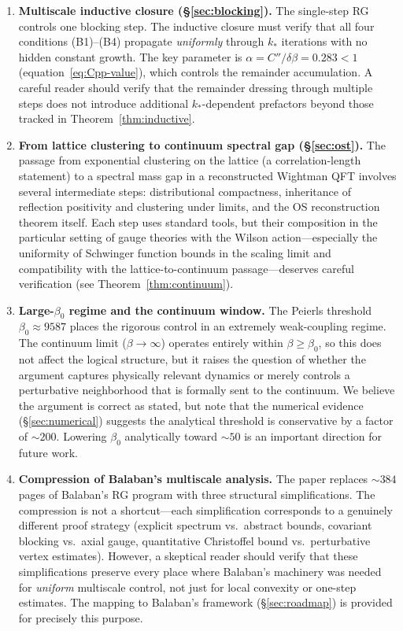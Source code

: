 \documentclass[11pt]{article}
\theoremstyle{definition}
\begin{document}
\begin{enumerate}[label=\textbf{(CB\arabic*)}]
\item \textbf{Multiscale inductive closure
(\S\ref{sec:blocking}).}
The single-step RG controls one blocking step.
The inductive closure must verify that all four conditions
(B1)--(B4) propagate \emph{uniformly} through $k_*$
iterations with no hidden constant growth.
The key parameter is $\alpha=C''/\delta\beta=0.283<1$
(equation~\eqref{eq:Cpp-value}), which controls the
remainder accumulation.  A careful reader should verify
that the remainder dressing through multiple steps does
not introduce additional $k_*$-dependent prefactors
beyond those tracked in Theorem~\ref{thm:inductive}.

\item \textbf{From lattice clustering to continuum
spectral gap (\S\ref{sec:ost}).}
The passage from exponential clustering on the lattice
(a correlation-length statement) to a spectral mass gap
in a reconstructed Wightman QFT involves several
intermediate steps: distributional compactness, inheritance
of reflection positivity and clustering under limits,
and the OS reconstruction theorem itself.  Each step
uses standard tools, but their composition in the
particular setting of gauge theories with the Wilson
action---especially the uniformity of Schwinger function
bounds in the scaling limit and compatibility with
the lattice-to-continuum passage---deserves careful
verification (see Theorem~\ref{thm:continuum}).

\item \textbf{Large-$\beta_0$ regime
and the continuum window.}
The Peierls threshold $\beta_0\approx 9587$ places
the rigorous control in an extremely weak-coupling regime.
The continuum limit ($\beta\to\infty$) operates entirely
within $\beta\ge\beta_0$, so this does not affect
the logical structure, but it raises the question of
whether the argument captures physically relevant
dynamics or merely controls a perturbative neighborhood
that is formally sent to the continuum.  We believe
the argument is correct as stated, but note that the
numerical evidence (\S\ref{sec:numerical}) suggests the
analytical threshold is conservative by a factor of
${\sim}200$.  Lowering $\beta_0$ analytically toward
${\sim}50$ is an important direction for future work.

\item \textbf{Compression of Balaban's
multiscale analysis.}
The paper replaces ${\sim}384$ pages of
Balaban's RG program with three structural simplifications.
The compression is not a shortcut---each simplification
corresponds to a genuinely different proof strategy
(explicit spectrum vs.\ abstract bounds, covariant
blocking vs.\ axial gauge, quantitative Christoffel
bound vs.\ perturbative vertex estimates).  However,
a skeptical reader should verify that these
simplifications preserve every place where Balaban's
machinery was needed for \emph{uniform} multiscale
control, not just for local convexity or one-step
estimates.  The mapping to Balaban's framework
(\S\ref{sec:roadmap}) is provided for precisely this
purpose.
\end{enumerate}
\end{document}
